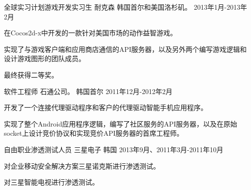 \begin{cventries}
  \cventry
    {全球实习计划游戏开发实习生} %
    {耐克森} %
    {韩国首尔和美国洛杉矶。} %
    {2013年1月-2013年2月} %
    {
      \begin{cvitems} %
        \item {在Cocos2d-x中开发的一款针对美国市场的动作益智游戏。}
        \item {实现了与游戏客户端和应用商店通信的API服务器，以及另外两个编写游戏逻辑和设计游戏图形的团队成员。}
        \item {最终获得二等奖。}
      \end{cvitems}
    }

  \cventry
    {软件工程师} %
    {石通公司。} %
    {韩国首尔} %
    {2011年12月-2012年2月} %
    {
      \begin{cvitems} %
        \item {开发了一个连接代理驱动程序和客户的代理驱动智能手机应用程序。}
        \item {实现了整个Android应用程序逻辑，编写了社区服务的API服务器，以及在原始socket上设计竞价协议和实现竞价API服务器的首席工程师。}
      \end{cvitems}
    }

  \cventry
    {自由职业渗透测试人员} %
    {三星电子} %
    {韩国} %
    {2013年9月、2011年3月-2011年10月} %
    {
      \begin{cvitems} %
        \item {对企业移动安全解决方案三星诺克斯进行渗透测试。}
        \item {对三星智能电视进行渗透测试。}
      \end{cvitems}
    }

\end{cventries}
